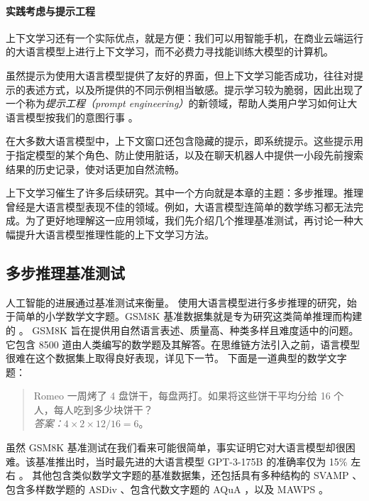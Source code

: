 \paragraph{实践考虑与提示工程}
上下文学习还有一个实际优点，就是方便：我们可以用智能手机，在商业云端运行的大语言模型上进行上下文学习，而不必费力寻找能训练大模型的计算机。

虽然提示为使用大语言模型提供了友好的界面，但上下文学习能否成功，往往对提示的表述方式，以及所提供的不同示例相当敏感。提示学习较为脆弱，因此出现了一个称为{\em 提示工程（prompt engineering）}的新领域，帮助人类用户学习如何让大语言模型按我们的意图行事 \citep{radford2019language,wei2022emergent,giray2023prompt,sahoo2024systematic}。

在大多数大语言模型中，上下文窗口还包含隐藏的提示，即系统提示。这些提示用于指定模型的某个角色、防止使用脏话，以及在聊天机器人中提供一小段先前搜索结果的历史记录，使对话更加自然流畅。

上下文学习催生了许多后续研究。其中一个方向就是本章的主题：多步推理。推理曾经是大语言模型表现不佳的领域。例如，大语言模型连简单的数学练习都无法完成。为了更好地理解这一应用领域，我们先介绍几个推理基准测试，再讨论一种大幅提升大语言模型推理性能的上下文学习方法。

\subsection{多步推理基准测试}\label{sec:benchmarks}
人工智能的进展通过基准测试来衡量。
使用大语言模型进行多步推理的研究，始于简单的小学数学文字题。GSM8K 基准数据集就是专为研究这类简单推理而构建的 \citep{cobbe2021training}。
GSM8K 旨在提供用自然语言表述、质量高、种类多样且难度适中的问题。它包含 8500 道由人类编写的数学题及其解答。在思维链方法引入之前，语言模型很难在这个数据集上取得良好表现，详见下一节。
下面是一道典型的数学文字题：
\begin{quotation}
 Romeo 一周烤了 4 盘饼干，每盘两打。如果将这些饼干平均分给 16 个人，每人吃到多少块饼干？\\
{\em 答案：}$4\times 2\times 12/16=6$。
\end{quotation}

虽然 GSM8K 基准测试在我们看来可能很简单，事实证明它对大语言模型却很困难。该基准推出时，当时最先进的大语言模型 GPT-3-175B 的准确率仅为 15\% 左右 \citep{wei2022chain}。
其他包含类似数学文字题的基准数据集，还包括具有多种结构的 SVAMP \citep{patel2021nlp}、包含多样数学题的 ASDiv \citep{miao2021diverse}、包含代数文字题的 AQuA \citep{ling2017program}，以及 MAWPS \citep{koncel2016mawps}。

